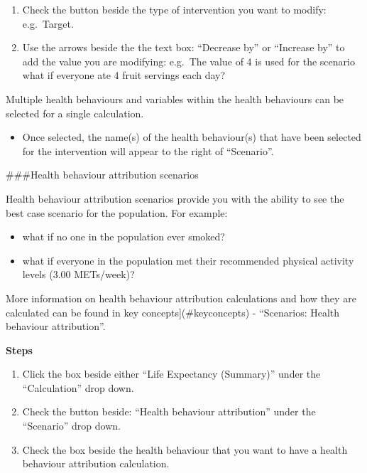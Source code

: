 \documentclass[]{book}
\providecommand{\tightlist}{%
  \setlength{\itemsep}{0pt}\setlength{\parskip}{0pt}}
\begin{document}
\begin{enumerate}
\def\labelenumi{\arabic{enumi}.}
\setcounter{enumi}{4}
\item
  Check the button beside the type of intervention you want to modify: e.g.~Target.
\item
  Use the arrows beside the the text box: ``Decrease by'' or ``Increase by'' to add the value you are modifying: e.g.~The value of 4 is used for the scenario what if everyone ate 4 fruit servings each day?
\end{enumerate}

Multiple health behaviours and variables within the health behaviours can be selected for a single calculation.

\begin{itemize}
\tightlist
\item
  Once selected, the name(s) of the health behaviour(s) that have been selected for the intervention will appear to the right of ``Scenario''.
\end{itemize}

\#\#\#Health behaviour attribution scenarios

Health behaviour attribution scenarios provide you with the ability to see the best case scenario for the population. For example:

\begin{itemize}
\tightlist
\item
  what if no one in the population ever smoked?
\item
  what if everyone in the population met their recommended physical activity levels (3.00 METs/week)?
\end{itemize}

More information on health behaviour attribution calculations and how they are calculated can be found in key concepts{]}(\#keyconcepts) - ``Scenarios: Health behaviour attribution''.

\textbf{Steps}

\begin{enumerate}
\def\labelenumi{\arabic{enumi}.}
\item
  Click the box beside either ``Life Expectancy (Summary)'' under the ``Calculation'' drop down.
\item
  Check the button beside: ``Health behaviour attribution'' under the ``Scenario'' drop down.
\item
  Check the box beside the health behaviour that you want to have a health behaviour attribution calculation.
\end{enumerate}
\end{document}
